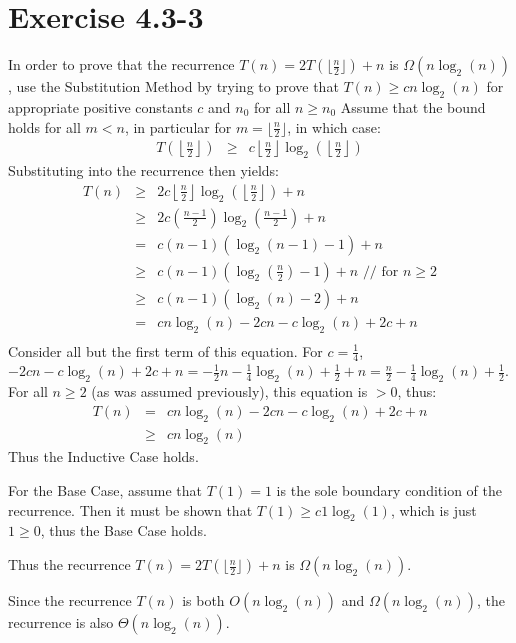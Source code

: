 \documentclass{article}
\begin{document}
\section*{Exercise 4.3-3}

In order to prove that the recurrence $T(n) = 2T(\lfloor \frac{n}{2} \rfloor) + n$ is $\Omega (n \log_2(n))$, use the Substitution Method by trying to prove that $T(n) \geq cn\log_2(n)$ for appropriate positive constants $c$ and $n_0$ for all $n \geq n_0$
Assume that the bound holds for all $m < n$, in particular for $m = \lfloor \frac{n}{2} \rfloor$, in which case:
\begin{eqnarray*}
	T\left(\left\lfloor \frac{n}{2} \right\rfloor\right) &\geq& c \left\lfloor \frac{n}{2} \right\rfloor \log_2\left(\left\lfloor \frac{n}{2} \right\rfloor\right)
\end{eqnarray*}
Substituting into the recurrence then yields:
\begin{eqnarray*}
	T(n) &\geq& 2c\left\lfloor \frac{n}{2} \right\rfloor \log_2\left(\left\lfloor \frac{n}{2} \right\rfloor\right) + n \\
	 &\geq& 2c \left( \frac{n - 1}{2} \right) \log_2 \left( \frac{n - 1}{2} \right) + n \\
	 &=& c (n - 1) (\log_2(n - 1) - 1) + n \\
	 &\geq& c (n - 1) \left(\log_2\left( \frac{n}{2}\right) - 1\right) + n \text{  // for $n \geq 2$} \\
	 &\geq& c (n - 1) (\log_2(n) - 2) + n \\
	 &=& cn \log_2(n) - 2cn - c\log_2(n) + 2c + n \\
\end{eqnarray*}
Consider all but the first term of this equation.  For $c = \frac{1}{4}$, $-2cn - c\log_2(n) + 2c + n = -\frac{1}{2}n - \frac{1}{4}\log_2(n) + \frac{1}{2} + n = \frac{n}{2} - \frac{1}{4} \log_2(n) + \frac{1}{2}$.  For all $n \geq 2$ (as was assumed previously), this equation is $> 0$, thus:
\begin{eqnarray*}
	T(n) &=& cn \log_2(n) - 2cn - c\log_2(n) + 2c + n \\
	 &\geq& cn \log_2(n)
\end{eqnarray*}
Thus the Inductive Case holds.

For the Base Case, assume that $T(1) = 1$ is the sole boundary condition of the recurrence.  Then it must be shown that $T(1) \geq c 1 \log_2(1)$, which is just $1 \geq 0$, thus the Base Case holds.

Thus the recurrence $T(n) = 2T(\lfloor \frac{n}{2} \rfloor) + n$ is $\Omega (n \log_2(n))$.

Since the recurrence $T(n)$ is both $O(n \log_2(n))$ and $\Omega(n \log_2(n))$, the recurrence is also $\Theta(n \log_2(n))$.
\end{document}
